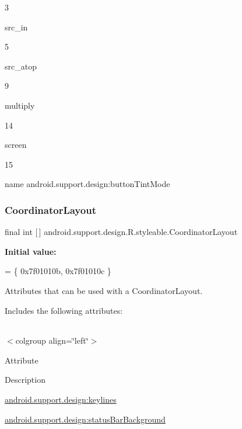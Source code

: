 3

{\ttfamily src\+\_\+in}

5

{\ttfamily src\+\_\+atop}

9

{\ttfamily multiply}

14

{\ttfamily screen}

15

name android.\+support.\+design\+:button\+Tint\+Mode \mbox{\label{classandroid_1_1support_1_1design_1_1R_1_1styleable_aa61378a506fc889e9e7af20a32b5fa05}} 
\subsubsection{\texorpdfstring{Coordinator\+Layout}{CoordinatorLayout}}
{\footnotesize\ttfamily final int \mbox{[}$\,$\mbox{]} android.\+support.\+design.\+R.\+styleable.\+Coordinator\+Layout\hspace{0.3cm}{\ttfamily [static]}}

{\bfseries Initial value\+:}
\begin{DoxyCode}
= \{
            0x7f01010b, 0x7f01010c
        \}
\end{DoxyCode}
Attributes that can be used with a Coordinator\+Layout. 

Includes the following attributes\+:

\tabulinesep=1mm
\begin{longtabu} spread 0pt [c]{*{0}{|X[-1]}|}
\hline
\end{longtabu}
$<$colgroup align=\char`\"{}left\char`\"{}$>$ 

Attribute

Description 

{\ttfamily \hyperlink{classandroid_1_1support_1_1design_1_1R_1_1styleable_a61311d684777dd9d1ff2b1e62326b8ef}{android.\+support.\+design\+:keylines}}

{\ttfamily \hyperlink{classandroid_1_1support_1_1design_1_1R_1_1styleable_ab58445af81b09a3c56a576412fa98b25}{android.\+support.\+design\+:status\+Bar\+Background}}


